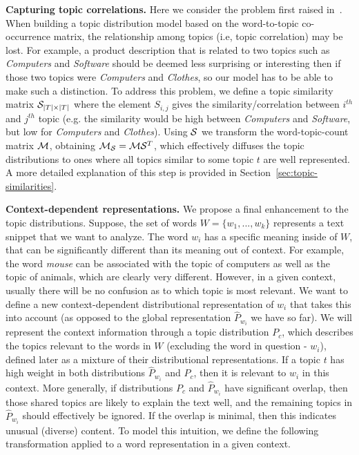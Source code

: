  {\bf Capturing topic correlations.} Here we consider the problem
first raised in~\cite{bache:2013}. When building a topic
distribution model based on the word-to-topic co-occurrence matrix,
the relationship among topics 
(i.e, topic correlation) may be lost. 
For example, a product description that is related to two
topics such as {\em Computers} and {\em Software} should be deemed
less surprising or interesting then if those two topics were {\em
  Computers} and {\em Clothes}, so our model has to be able to make
such a distinction.
To address this problem, we define a topic similarity
matrix ${\mathcal S}_{|T|\times|T|}$ 
where the element $S_{i,j}$ gives the similarity/correlation between
$i^{th}$ and $j^{th}$ topic (e.g. the similarity would be high between {\em
  Computers} and {\em Software}, but low for {\em Computers} and
{\em Clothes}). Using
${\mathcal S}$ we transform the word-topic-count matrix ${\mathcal M}$, obtaining
${\mathcal M}_{\mathcal S} = {\mathcal M}{\mathcal S}^T$, which effectively diffuses the topic
distributions to ones where all topics similar to some topic $t$ are
well represented. A more detailed explanation of this step is provided
in Section~\ref{sec:topic-similarities}.

{\bf Context-dependent representations.} We propose a final
enhancement to the topic 
distributions. Suppose, the set of words $W=\{w_1,...,w_k\}$
represents a text snippet that we want to analyze. The word $w_i$ has
a specific meaning inside of $W$, that can be significantly different
than its meaning out of context. For example, the word {\em mouse} can
be associated with the topic of computers as well as the topic of
animals, which are clearly very different. However, in a given
context, usually there will be no confusion as to which topic is
most relevant. We want to define a new context-dependent
distributional representation of $w_i$ that takes this into account
(as opposed to the global representation $\widehat{P}_{w_i}$ we have so far).
We will represent the context information through a topic
distribution $P_c$, which describes the
topics relevant to the words in $W$ (excluding the word in question - $w_i$), defined later as a mixture of
their distributional representations. If a topic $t$ has high weight in
both distributions $\widehat{P}_{w_i}$ and $P_c$, then it is relevant to $w_i$ in this
context. More generally, if distributions $P_c$ and $\widehat{P}_{w_i}$ have
significant overlap, then those shared topics are likely to explain the
text well, and the remaining topics in $\widehat{P}_{w_i}$ should effectively be
ignored. If the overlap is minimal, then this indicates unusual
(diverse) content. To model this intuition, we define the following
transformation applied to a word representation in a given context.

